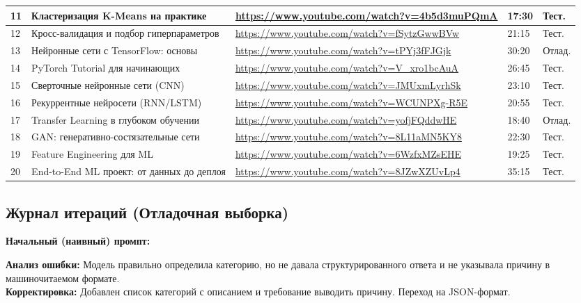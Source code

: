 \documentclass[oneside,a4paper,14pt]{extarticle}
\begin{document}
\begin{table}[H]
\centering
\begin{tabular}{|p{0.5cm}|p{6cm}|p{6cm}|p{1.5cm}|p{1cm}|}
11 & Кластеризация K-Means на практике & \url{https://www.youtube.com/watch?v=4b5d3muPQmA} & 17:30 & Тест. \\ \hline
12 & Кросс-валидация и подбор гиперпараметров & \url{https://www.youtube.com/watch?v=fSytzGwwBVw} & 21:15 & Тест. \\ \hline
13 & Нейронные сети с TensorFlow: основы & \url{https://www.youtube.com/watch?v=tPYj3fFJGjk} & 30:20 & Отлад. \\ \hline
14 & PyTorch Tutorial для начинающих & \url{https://www.youtube.com/watch?v=V_xro1bcAuA} & 26:45 & Тест. \\ \hline
15 & Сверточные нейронные сети (CNN) & \url{https://www.youtube.com/watch?v=JMUxmLyrhSk} & 23:10 & Тест. \\ \hline
16 & Рекуррентные нейросети (RNN/LSTM) & \url{https://www.youtube.com/watch?v=WCUNPXg-R5E} & 20:55 & Тест. \\ \hline
17 & Transfer Learning в глубоком обучении & \url{https://www.youtube.com/watch?v=yofjFQddwHE} & 18:40 & Отлад. \\ \hline
18 & GAN: генеративно-состязательные сети & \url{https://www.youtube.com/watch?v=8L11aMN5KY8} & 22:30 & Тест. \\ \hline
19 & Feature Engineering для ML & \url{https://www.youtube.com/watch?v=6WzfxMZsEHE} & 19:25 & Тест. \\ \hline
20 & End-to-End ML проект: от данных до деплоя & \url{https://www.youtube.com/watch?v=8JZwXZUvLp4} & 35:15 & Тест. \\ \hline
\end{tabular}
\end{table}

\newpage
\subsection{Журнал итераций (Отладочная выборка)}
\noindent
\textbf{Начальный (наивный) промпт:}


\noindent
\textbf{Анализ ошибки:} Модель правильно определила категорию, но не давала структурированного ответа и не указывала причину в машиночитаемом формате.\\
\textbf{Корректировка:} Добавлен список категорий с описанием и требование выводить причину. Переход на JSON-формат.
\end{document}
